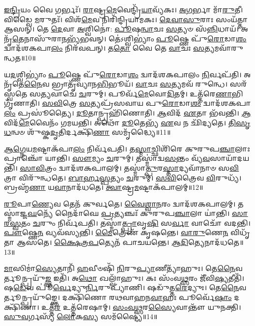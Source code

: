 \-\ul{𑌇}\-\-\ul{𑌨𑍍𑌦𑍍𑌰𑌿}\-𑌯𑌂 𑌵𑍈 𑌗𑌰𑍍𑌭𑌃᳴।
\-\ul{𑌰𑌾}\-𑌷𑍍𑌟𑍍𑌰\-\ul{𑌮𑍇}\-𑌵𑍇𑌨𑍍𑌦𑍍𑌰𑌿᳴\-\ul{𑌯𑌾}\-𑌵𑍍𑌯᳴𑌕𑌃।
\-\ul{𑌅}\-\-\ul{𑌗}\-𑌰𑍍𑌭𑌾 𑌮𑌾᳴\-\ul{𑌰𑍁}\-𑌤𑍀।
𑌵𑌿𑌡𑍍𑌵𑍈 \ul{𑌮}\-𑌰𑍁𑌤𑌃᳴।
𑌵𑌿𑌶᳴\-\ul{𑌮𑍇}\-𑌵 𑌨𑌿𑌰𑌿᳴𑌨𑍍𑌦𑍍𑌰𑌿𑌯𑌾𑌮𑌕𑌃।
\-\ul{𑌦𑍇}\-\-\ul{𑌵𑌾}\-\-\ul{𑌸𑍁}\-𑌰𑌾𑌃 𑌸𑌂𑌯᳴𑌤𑍍𑌤𑌾 𑌆𑌸𑌨𑍍।
𑌤𑍇 \ul{𑌦𑍇}\-𑌵𑌾 \ul{𑌅}\-𑌶𑍍𑌵𑌿𑌨𑍋॑: \ul{𑌪𑍂}\-𑌷\-\ul{𑌨𑍍𑌵𑌾}\-𑌚𑌃 \ul{𑌸}\-𑌤𑍍𑌯𑍞 𑌸᳴\-\ul{𑌨𑍍𑌨𑌿}\-𑌧𑌾𑌯᳴।
𑌅𑌨𑍃᳴\-\ul{𑌤𑍇}\-𑌨𑌾𑌸𑍁᳴𑌰𑌾\-\ul{𑌨}\-𑌭𑍍𑌯᳴𑌭𑌵𑌨𑍍।
𑌤𑍇॑𑌽𑌶𑍍𑌵𑌿𑌭𑍍𑌯𑌾𑌂॑ \ul{𑌪𑍂}\-𑌷𑍍𑌣𑍇 𑌪𑍁᳴\-\ul{𑌰𑍋}\-𑌡𑌾\-\ul{𑌶𑌂} 𑌦𑍍𑌵𑌾𑌦᳴𑌶𑌕𑌪𑌾\-\ul{𑌲𑌂} 𑌨𑌿𑌰᳴𑌵𑌪𑌨𑍍।
𑌤\-\ul{𑌤𑍋} 𑌵𑍈 𑌤𑍇 \ul{𑌵𑌾}\-𑌚𑌃 \ul{𑌸}\-𑌤𑍍𑌯𑌮𑌵𑌾᳴𑌰𑍁𑌨𑍍𑌧𑌤॥10॥

𑌯\-\ul{𑌦}\-𑌶𑍍𑌵𑌿𑌭𑍍𑌯𑌾𑌂॑ \ul{𑌪𑍂}\-𑌷𑍍𑌣𑍇 𑌪𑍁᳴\-\ul{𑌰𑍋}\-𑌡𑌾\-\ul{𑌶𑌂} 𑌦𑍍𑌵𑌾𑌦᳴𑌶𑌕𑌪𑌾𑌲𑌂 \ul{𑌨𑌿}\-𑌰𑍍𑌵𑌪᳴𑌤𑌿।
𑌅𑌨𑍃᳴𑌤𑍇\-\ul{𑌨𑍈}\-𑌵 𑌭𑍍𑌰𑌾𑌤𑍃᳴𑌵𑍍𑌯𑌾𑌨\-\ul{𑌭𑌿}\-𑌭𑍂𑌯᳴।
\-\ul{𑌵𑌾}\-𑌚𑌃 \ul{𑌸}\-𑌤𑍍𑌯𑌮𑌵᳴ 𑌰𑍁𑌨𑍍𑌧𑍇।
𑌸𑌰᳴𑌸𑍍𑌵𑌤𑍇 𑌸\-\ul{𑌤𑍍𑌯}\-𑌵𑌾𑌚𑍇᳴ \ul{𑌚}\-𑌰𑍁𑌮𑍍।
𑌪𑍂𑌰𑍍𑌵᳴\-\ul{𑌮𑍇}\-𑌵𑍋\-\ul{𑌦𑌿}\-𑌤𑌮𑍍।
𑌉𑌤𑍍𑌤᳴𑌰𑍇\-\ul{𑌣𑌾}\-𑌭𑌿 𑌗𑍃᳴𑌣𑌾𑌤𑌿।
\-\ul{𑌸}\-\-\ul{𑌵𑌿}\-𑌤𑍍𑌰𑍇 \ul{𑌸}\-𑌤𑍍𑌯𑌪𑍍𑌰᳴𑌸𑌵𑌾𑌯 𑌪𑍁\-\ul{𑌰𑍋}\-𑌡𑌾\-\ul{𑌶𑌂} 𑌦𑍍𑌵𑌾𑌦᳴𑌶𑌕𑌪𑌾\-\ul{𑌲𑌂} 𑌪𑍍𑌰𑌸𑍂॑𑌤𑍍𑌯𑍈।
\-\ul{𑌦𑍂}\-𑌤𑌾𑌨𑍍𑌪𑍍𑌰𑌹𑌿᳴𑌣𑍋𑌤𑌿।
\-\ul{𑌆}\-𑌵𑌿𑌦᳴ \ul{𑌏}\-𑌤𑌾 𑌭᳴𑌵𑌨𑍍𑌤𑌿।
\-\ul{𑌆}\-𑌵𑌿𑌦᳴\-\ul{𑌮𑍇}\-𑌵𑍈𑌨𑌂᳴ 𑌗𑌮𑌯𑌨𑍍𑌤𑌿।
𑌅𑌥𑍋᳴ \ul{𑌦𑍂}\-𑌤𑍇𑌭𑍍𑌯᳴ \ul{𑌏}\-𑌵 𑌨 𑌛𑌿᳴𑌦𑍍𑌯𑌤𑍇।
\-\ul{𑌤𑌿}\-\-\ul{𑌸𑍃}\-\-\ul{𑌧}\-𑌨𑍍𑌵𑍞 𑌶𑍁᳴𑌷𑍍𑌕\-\ul{𑌦𑍃}\-𑌤𑌿𑌰𑍍𑌦𑌕𑍍𑌷𑌿᳴\-\ul{𑌣𑌾} 𑌸𑌮𑍃᳴𑌦𑍍𑌧𑍍𑌯𑍈॥11॥\anuvakamend[\-\ul{𑌅}\-\-\ul{𑌰𑍍𑌧}\-\-\ul{𑌯}\-\-\ul{𑌤𑌿} \ul{𑌭}\-\-\ul{𑌵}\-\-\ul{𑌤𑍍𑌯}\-\-\ul{𑌰𑍁}\-\-\ul{𑌨𑍍𑌧}\-\-\ul{𑌤} \ul{𑌗}\-\-\ul{𑌮}\-\-\ul{𑌯}\-\-\ul{𑌨𑍍𑌤𑌿} 𑌦𑍍𑌵𑍇 𑌚᳴]

\-\ul{𑌆}\-\-\ul{𑌗𑍍𑌨𑍇}\-𑌯\-\ul{𑌮}\-𑌷𑍍𑌟𑌾\-𑌕᳴𑌪𑌾\-\ul{𑌲𑌂} 𑌨𑌿𑌰𑍍𑌵᳴𑌪𑌤𑌿।
𑌤\-\ul{𑌸𑍍𑌮𑌾}\-𑌚𑍍𑌛𑌿𑌶𑌿᳴𑌰𑍇 𑌕𑍁𑌰𑍁𑌪\-\ul{𑌞𑍍𑌚𑌾}\-𑌲𑌾𑌃 𑌪𑍍𑌰𑌾𑌞𑍍𑌚𑍋᳴ 𑌯𑌾𑌨𑍍𑌤𑌿।
\-\ul{𑌸𑍗}\-𑌮𑍍𑌯𑌂 \ul{𑌚}\-𑌰𑍁𑌮𑍍।
𑌤𑌸𑍍𑌮𑌾॑𑌦𑍍𑌵\-\ul{𑌸}\-𑌨𑍍𑌤𑌂 𑌵𑍍𑌯᳴\-\ul{𑌵}\-𑌸𑌾𑌯𑌾᳴𑌦𑌯𑌨𑍍𑌤𑌿।
\-\ul{𑌸𑌾}\-\-\ul{𑌵𑌿}\-𑌤𑍍𑌰𑌂 𑌦𑍍𑌵𑌾𑌦᳴𑌶𑌕𑌪𑌾𑌲𑌮𑍍।
𑌤𑌸𑍍𑌮𑌾॑\-\ul{𑌤𑍍𑌪𑍁}\-𑌰\-\ul{𑌸𑍍𑌤𑌾}\-𑌦𑍍𑌯𑌵𑌾᳴𑌨𑌾𑍞 𑌸\-\ul{𑌵𑌿}\-𑌤𑍍𑌰𑌾 𑌵𑌿𑌰𑍁᳴𑌨𑍍𑌧𑌤𑍇।
\-\ul{𑌬𑌾}\-\-\ul{𑌰𑍍}\-\-\ul{𑌹}\-\-\ul{𑌸𑍍𑌪}\-𑌤𑍍𑌯𑌂 \ul{𑌚}\-𑌰𑍁𑌮𑍍।
\-\ul{𑌸}\-\-\ul{𑌵𑌿}\-𑌤𑍍𑌰𑍈𑌵 \ul{𑌵𑌿}\-𑌰𑍁𑌧𑍍𑌯᳴।
𑌬𑍍𑌰𑌹𑍍𑌮᳴\-\ul{𑌣𑌾} 𑌯\-\ul{𑌵𑌾}\-𑌨𑌾𑌦᳴𑌧𑌤𑍇।
\-\ul{𑌤𑍍𑌵𑌾}\-𑌷𑍍𑌟𑍍𑌰\-\ul{𑌮}\-𑌷𑍍𑌟𑌾\-𑌕᳴𑌪𑌾𑌲𑌮𑍍॥12॥

\-\ul{𑌰𑍂}\-𑌪𑌾\-\ul{𑌣𑍍𑌯𑍇}\-𑌵 𑌤𑍇𑌨᳴ 𑌕𑍁𑌰𑍍𑌵𑌤𑍇।
\-\ul{𑌵𑍈}\-\-\ul{𑌶𑍍𑌵𑌾}\-\-\ul{𑌨}\-𑌰𑌂 𑌦𑍍𑌵𑌾𑌦᳴𑌶𑌕𑌪𑌾𑌲𑌮𑍍।
𑌤𑌸𑍍𑌮𑌾॑𑌜𑍍𑌜\-\ul{𑌘}\-𑌨𑍍𑌯𑍇᳴ 𑌨𑍈𑌦𑌾᳴𑌘𑍇 \ul{𑌪𑍍𑌰}\-𑌤𑍍𑌯𑌞𑍍𑌚𑌃᳴ 𑌕𑍁𑌰𑍁𑌪\-\ul{𑌞𑍍𑌚𑌾}\-𑌲𑌾 𑌯𑌾॑𑌨𑍍𑌤𑌿।
\-\ul{𑌸𑌾}\-\-\ul{𑌰}\-\-\ul{𑌸𑍍𑌵}\-𑌤𑌂 \ul{𑌚}\-𑌰𑍁𑌂 𑌨𑌿𑌰𑍍𑌵᳴𑌪𑌤𑌿।
𑌤𑌸𑍍𑌮𑌾॑\-\ul{𑌤𑍍𑌪𑍍𑌰𑌾}\-𑌵𑍃\-\ul{𑌷𑌿} 𑌸\-\ul{𑌰𑍍𑌵𑌾} 𑌵𑌾𑌚𑍋᳴ 𑌵𑌦𑌨𑍍𑌤𑌿।
\-\ul{𑌪𑍗}\-𑌷𑍍𑌣𑍇\-\ul{𑌨} 𑌵𑍍𑌯𑌵᳴𑌸𑍍𑌯𑌨𑍍𑌤𑌿।
\-\ul{𑌮𑍈}\-𑌤𑍍𑌰𑍇𑌣᳴ 𑌕𑍃𑌷𑌨𑍍𑌤𑍇।
\-\ul{𑌵𑌾}\-\-\ul{𑌰𑍁}\-𑌣𑍇\-\ul{𑌨} 𑌵𑌿𑌧𑍃᳴𑌤𑌾 𑌆𑌸𑌤𑍇।
\-\ul{𑌕𑍍𑌷𑍈}\-\-\ul{𑌤𑍍𑌰}\-\-\ul{𑌪}\-𑌤𑍍𑌯𑍇𑌨᳴ 𑌪𑌾𑌚𑌯𑌨𑍍𑌤𑍇।
\-\ul{𑌆}\-\-\ul{𑌦𑌿}\-𑌤𑍍𑌯𑍇𑌨𑌾𑌦᳴𑌧𑌤𑍇॥13॥

\-\ul{𑌮𑌾}\-𑌸𑌿𑌮𑌾॑\-\ul{𑌸𑍍𑌯𑍇}\-𑌤𑌾𑌨𑌿᳴ \ul{𑌹}\-𑌵𑍀𑍞𑌷𑌿᳴ \ul{𑌨𑌿}\-𑌰𑍁\-\ul{𑌪𑍍𑌯𑌾}\-𑌣𑍀𑌤𑍍𑌯𑌾᳴𑌹𑍁𑌃।
𑌤𑍇\-\ul{𑌨𑍈}\-𑌵𑌰𑍍𑌤𑍂𑌨𑍍𑌪𑍍𑌰𑌯𑍁᳴\-\ul{𑌙𑍍𑌕𑍍𑌤} 𑌇𑌤𑌿᳴।
𑌅\-\ul{𑌥𑍋} 𑌖𑌲𑍍𑌵𑌾᳴𑌹𑍁𑌃।
𑌕𑌃 𑌸𑌂᳴𑌵\-\ul{𑌥𑍍𑌸}\-𑌰𑌂 𑌜𑍀᳴𑌵𑌿\-\ul{𑌷𑍍𑌯}\-𑌤𑍀𑌤𑌿᳴।
𑌷\-\ul{𑌡𑍇}\-𑌵 𑌪𑍂॑\-\ul{𑌰𑍍𑌵𑍇}\-𑌦𑍍𑌯𑍁\-\ul{𑌰𑍍𑌨𑌿}\-𑌰𑍁𑌪𑍍𑌯𑌾᳴𑌣𑌿।
𑌷𑌡𑍁᳴𑌤𑍍𑌤\-\ul{𑌰𑍇}\-𑌦𑍍𑌯𑍁𑌃।
𑌤𑍇\-\ul{𑌨𑍈}\-𑌵𑌰𑍍𑌤𑍂𑌨𑍍𑌪𑍍𑌰𑌯𑍁᳴𑌙𑍍𑌕𑍍𑌤𑍇।
𑌦𑌕𑍍𑌷𑌿᳴𑌣𑍋 𑌰𑌥𑌵𑌾𑌹𑌨\-\ul{𑌵𑌾}\-𑌹𑌃 𑌪𑍂𑌰𑍍𑌵𑍇᳴\-\ul{𑌷𑌾𑌂} 𑌦𑌕𑍍𑌷𑌿᳴𑌣𑌾।
𑌉𑌤𑍍𑌤᳴\-\ul{𑌰} 𑌉𑌤𑍍𑌤᳴𑌰𑍇𑌷𑌾𑌮𑍍।
\-\ul{𑌸𑌂}\-\-\ul{𑌵}\-\-\ul{𑌥𑍍𑌸}\-𑌰\-\ul{𑌸𑍍𑌯𑍈}\-𑌵𑌾𑌨𑍍𑌤𑍗᳴ 𑌯𑍁𑌨𑌕𑍍𑌤𑌿।
\-\ul{𑌸𑍁}\-\-\ul{𑌵}\-𑌰𑍍𑌗𑌸𑍍𑌯᳴ \ul{𑌲𑍋}\-𑌕\-\ul{𑌸𑍍𑌯} 𑌸𑌮᳴𑌷𑍍𑌟𑍍𑌯𑍈॥14॥\anuvakamend[\-\ul{𑌤𑍍𑌵𑌾}\-𑌷𑍍𑌟𑍍𑌰\-\ul{𑌮}\-𑌷𑍍𑌟𑌾\-𑌕᳴𑌪𑌾𑌲𑌂 𑌦𑌧𑌤𑍇 𑌯𑍁\-\ul{𑌨}\-𑌕𑍍𑌤𑍍𑌯𑍇𑌕𑌂᳴ 𑌚]

